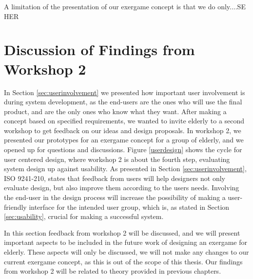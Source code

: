 A limitation of the presentation of our exergame concept is that we do only....SE HER

\section{Discussion of Findings from Workshop 2}
\label{sec:discfindings2}
In Section \ref{sec:userinvolvement} we presented how important user involvement is during system development, as the end-users are the ones who will use the final product, and are the only ones who know what they want. After making a concept based on specified requirements, we wanted to invite elderly to a second workshop to get feedback on our ideas and design proposals. In workshop 2, we presented our prototypes for an exergame concept for a group of elderly, and we opened up for questions and discussions. Figure \ref{userdesign} shows the cycle for user centered design, where workshop 2 is about the fourth step, evaluating system design up against usability. As presented in Section \ref{sec:userinvolvement}, ISO 9241-210, states that feedback from users will help designers not only evaluate design, but also improve them according to the users needs. Involving the end-user in the design process will increase the possibility of making a user-friendly interface for the intended user group, which is, as stated in Section \ref{sec:usability}, crucial for making a successful system. 

In this section feedback from workshop 2 will be discussed, and we will present important aspects to be included in the future work of designing an exergame for elderly. These aspects will only be discussed, we will not make any changes to our current exergame concept, as this is out of the scope of this thesis. Our findings from workshop 2 will be related to theory provided in previous chapters.


